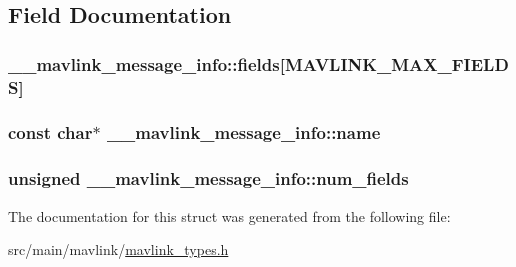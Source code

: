 \subsection{Field Documentation}
\hypertarget{struct____mavlink__message__info_a4a15f20958b43cb1282575c6da67a37b}{
\subsubsection[{fields}]{ \+\_\+\+\_\+mavlink\+\_\+message\+\_\+info\+::fields\mbox{[}{\bf M\+A\+V\+L\+I\+N\+K\+\_\+\+M\+A\+X\+\_\+\+F\+I\+E\+L\+D\+S}\mbox{]}}}\label{struct____mavlink__message__info_a4a15f20958b43cb1282575c6da67a37b}
\hypertarget{struct____mavlink__message__info_a5e8b48c51cb8bc44bd844d1c3049ee32}{
\subsubsection[{name}]{\setlength{\rightskip}{0pt plus 5cm}const char$\ast$ \+\_\+\+\_\+mavlink\+\_\+message\+\_\+info\+::name}}\label{struct____mavlink__message__info_a5e8b48c51cb8bc44bd844d1c3049ee32}
\hypertarget{struct____mavlink__message__info_a0c343bcc1f27884e8c2ab875e7efc2e5}{
\subsubsection[{num\+\_\+fields}]{\setlength{\rightskip}{0pt plus 5cm}unsigned \+\_\+\+\_\+mavlink\+\_\+message\+\_\+info\+::num\+\_\+fields}}\label{struct____mavlink__message__info_a0c343bcc1f27884e8c2ab875e7efc2e5}


The documentation for this struct was generated from the following file\+:\begin{DoxyCompactItemize}
\item 
src/main/mavlink/\hyperlink{mavlink__types_8h}{mavlink\+\_\+types.\+h}\end{DoxyCompactItemize}
